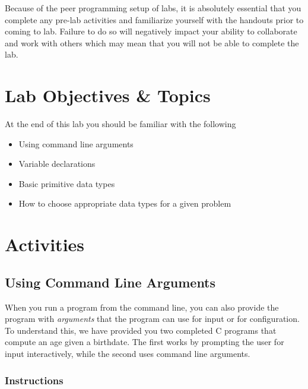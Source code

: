 \documentclass[12pt]{scrartcl}
\begin{document}
Because of the peer programming setup of labs, it is absolutely 
essential that you complete any pre-lab activities and familiarize
yourself with the handouts prior to coming to lab.  Failure to do
so will negatively impact your ability to collaborate and work with 
others which may mean that you will not be able to complete the
lab.  


\section{Lab Objectives \& Topics}
At the end of this lab you should be familiar with the following
\begin{itemize}
  \item Using command line arguments
  \item Variable declarations
  \item Basic primitive data types
  \item How to choose appropriate data types for a given problem
\end{itemize}

\section{Activities}

\subsection{Using Command Line Arguments}

When you run a program from the command line, you can also provide
the program with \emph{arguments} that the program can use for input
or for configuration.  To understand this, we have provided you two
completed C programs that compute an age given a birthdate.  The
first works by prompting the user for input interactively, while the second
uses command line arguments.

\subsubsection*{Instructions}
\end{document}
